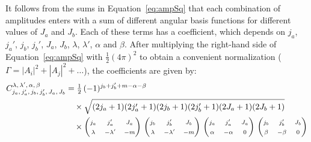 It follows from the sums in Equation~\ref{eq:ampSq} that each combination of amplitudes enters with
a sum of different angular basis functions for different values of $J_a$ and $J_b$. Each of these
terms has a coefficient, which depends on $j_a$, $j_a'$, $j_b$, $j_b'$, $J_a$, $J_b$, $\lambda$,
$\lambda'$, $\alpha$ and $\beta$.  After multiplying the right-hand side of Equation~\ref{eq:ampSq}
with $\tfrac{1}{2} (4\pi)^2$ to obtain a convenient normalization
($\Gamma=|A_i|^2+|A_j|^2+\ldots$), the coefficients are given by:
\begin{equation} \label{eq:angCoefs} \begin{split}
  C_{j_a,\,j_a',\,j_b,\,j_b',\,J_a,\,J_b}^{\lambda,\,\lambda',\,\alpha,\,\beta}
  &= \tfrac{1}{2}\, (-1)^{j_b+j_b'+m-\alpha-\beta}
  \\&\quad\times
  \sqrt{(2j_a+1)(2j_a'+1)(2j_b+1)(2j_b'+1)(2J_a+1)(2J_b+1)}
  \\&\quad\times
  \begin{pmatrix}
    {\scriptstyle j_a} & {\scriptstyle j_a'} & {\scriptstyle J_a}\\
    {\scriptstyle \lambda} & {\scriptstyle -\lambda'} & {\scriptstyle -m}
  \end{pmatrix}\,
  \begin{pmatrix}
    {\scriptstyle j_b} & {\scriptstyle j_b'} & {\scriptstyle J_b} \\
    {\scriptstyle \lambda} & {\scriptstyle -\lambda'} & {\scriptstyle -m}
  \end{pmatrix}\,
  \begin{pmatrix}
    {\scriptstyle j_a} & {\scriptstyle j_a'} & {\scriptstyle J_a}\\
    {\scriptstyle \alpha} & {\scriptstyle -\alpha} & {\scriptstyle 0}
  \end{pmatrix}\,
  \begin{pmatrix}
    {\scriptstyle j_b} & {\scriptstyle j_b'} & {\scriptstyle J_b}\\
    {\scriptstyle \beta} & {\scriptstyle -\beta} & {\scriptstyle 0}
  \end{pmatrix}
\end{split} \end{equation}

